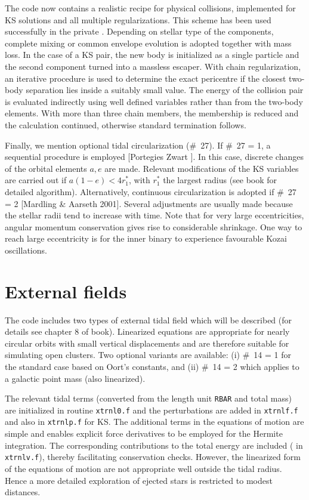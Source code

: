 \documentclass[12pt]{article}
\begin{document}
The code now contains a realistic recipe for physical collisions,
implemented for KS solutions and all multiple regularizations.
This scheme has been used successfully in the private {}.
Depending on stellar type of the components, complete mixing or common
envelope evolution is adopted together with mass loss.
In the case of a KS pair, the new \cm body is initialized as a
single particle and the second component turned into a massless escaper.
With chain regularization, an iterative procedure is used to determine the
exact pericentre if the closest two-body separation lies inside a suitably
small value.
The energy of the collision pair is evaluated indirectly using well defined
variables rather than from the two-body elements.
With more than three chain members, the membership is reduced and the
calculation continued, otherwise standard termination follows.

Finally, we mention optional tidal circularization (\#~27).
If \#~27 = 1, a sequential procedure is employed
[Portegies Zwart ].
In this case, discrete changes of the orbital elements $a, e$ are made.
Relevant modifications of the KS variables are carried out if
$a (1 - e) < 4 r^{\ast}_1$, with $r^{\ast}_1$ the largest radius (see book
for detailed algorithm).
Alternatively, continuous circularization is adopted if \#~27 = 2
[Mardling \& Aarseth 2001].
Several adjustments are usually made because the stellar radii tend to
increase with time.
Note that for very large eccentricities, angular momentum conservation
gives rise to considerable shrinkage.
One way to reach large eccentricity is for the inner binary to experience
favourable Kozai oscillations.

\section{External fields}

The code includes two types of external tidal field which will be described
(for details see chapter 8 of book).
Linearized equations are appropriate for nearly circular orbits with
small vertical displacements and are therefore suitable for simulating
open clusters.
Two optional variants are available: (i) \#~14 = 1 for the standard case
based on Oort's constants, and (ii) \#~14 = 2 which applies to a galactic
point mass (also linearized).

The relevant tidal terms (converted from the length unit {\tt RBAR} and
total mass) are initialized in routine {\tt xtrnl0.f} and the perturbations
are added in {\tt xtrnlf.f} and also in {\tt xtrnlp.f} for KS.
The additional terms in the equations of motion are simple and enables
explicit force derivatives to be employed for the Hermite integration.
The corresponding contributions to the total energy are included
( in {\tt xtrnlv.f}), thereby facilitating conservation checks.
However, the linearized form of the equations of motion are not appropriate
well outside the tidal radius.
Hence a more detailed exploration of ejected stars is restricted to modest
distances.
\end{document}
